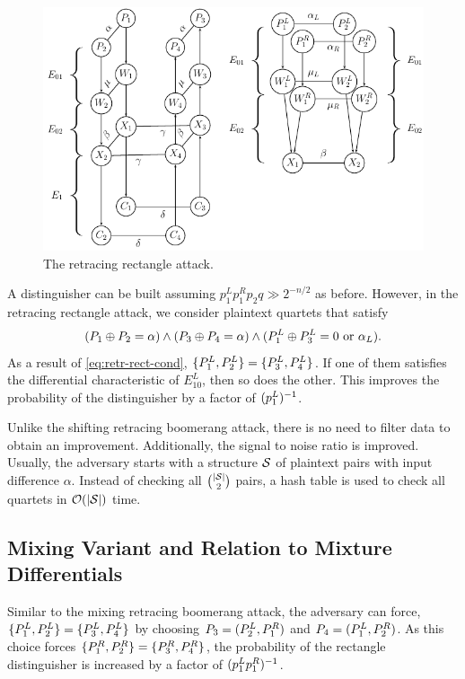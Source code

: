 \documentclass[notheorems]{beamer}
\theoremstyle{definition}
\theoremstyle{example}
\begin{document}
\begin{figure}
    \centering
    \includegraphics[width=0.6\columnwidth]{images/retracing_rectangle.png}
    \caption{The retracing rectangle attack.}
    \label{fig:retr-rectangle}
\end{figure}

A distinguisher can be built assuming \(p_1^Lp_1^Rp_2q \gg 2^{-n/2}\) as before.
However, in the retracing rectangle attack, we consider plaintext quartets that
satisfy
\begin{equation}
    (P_1 \oplus P_2 = \alpha) \land (P_3 \oplus P_4 = \alpha) \land (P_1^L \oplus P_3^L = 0 \textrm{ or } \alpha_L).
    \label{eq:retr-rect-cond}
\end{equation}
As a result of \eqref{eq:retr-rect-cond}, \(\{P_1^L, P_2^L\} = \{P_3^L,
P_4^L\}\). If one of them satisfies the differential characteristic of
\(E_{10}^L\), then so does the other. This improves the probability of the
distinguisher by a factor of \((p_1^L)^{-1}\).

Unlike the shifting retracing boomerang attack, there is no need to filter data
to obtain an improvement. Additionally, the signal to noise ratio is improved.
Usually, the adversary starts with a structure \(\mathcal S\) of plaintext pairs with
input difference \(\alpha\). Instead of checking all \(\binom{\left\vert\mathcal S\right\vert}{2}\)
pairs, a hash table is used to check all quartets in \(\mathcal O(\left\vert\mathcal S\right\vert)\)
time.

\subsection{Mixing Variant and Relation to Mixture Differentials}

Similar to the mixing retracing boomerang attack, the adversary can force,
\(\{P_1^L, P_2^L\} = \{P_3^L, P_4^L\}\) by choosing \(P_3 = (P_2^L,
P_1^R)\) and \(P_4 = (P_1^L, P_2^R)\). As this choice forces
\(\{P_1^R, P_2^R\} = \{P_3^R, P_4^R\}\), the probability of the
rectangle distinguisher is increased by a factor of \((p_1^Lp_1^R)^{-1}\).
\end{document}
